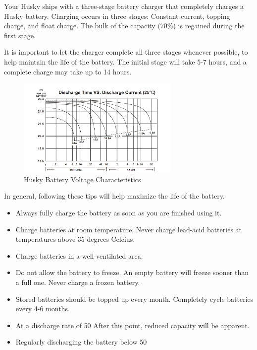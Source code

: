 \documentclass[]{clearpath-latex/clearpath-manual}
\begin{document}
Your Husky ships with a three-stage battery charger that completely charges a Husky battery.  
Charging occurs in three stages: Constant current, topping charge, and float charge.  
The bulk of the capacity (70\%) is regained during the first stage.

It is important to let the charger complete all three stages whenever possible, 
to help maintain the life of the battery.  The initial stage will take 5-7 hours,
and a complete charge may take up to 14 hours.

\begin{figure}[h]
	\centering
	\includegraphics[width=0.7\textwidth]{battery-chart.png}
	\caption{Husky Battery Voltage Characteristics}
	\label{battery-chart}
\end{figure}

In general, following these tips will help maximize the life of the battery.

\begin{itemize}
	\item Always fully charge the battery as soon as you are finished using it.
	\item Charge batteries at room temperature.  Never charge lead-acid batteries at temperatures above 35 degrees Celcius.
	\item Charge batteries in a well-ventilated area.
	\item Do not allow the battery to freeze.  An empty battery will freeze sooner than a full one.  Never charge a frozen battery.
	\item Stored batteries should be topped up every month.  Completely cycle batteries every 4-6 months.
	\item At a discharge rate of 50%
	After this point, reduced capacity will be apparent.
	\item Regularly discharging the battery below 50%
\end{itemize}
\end{document}
